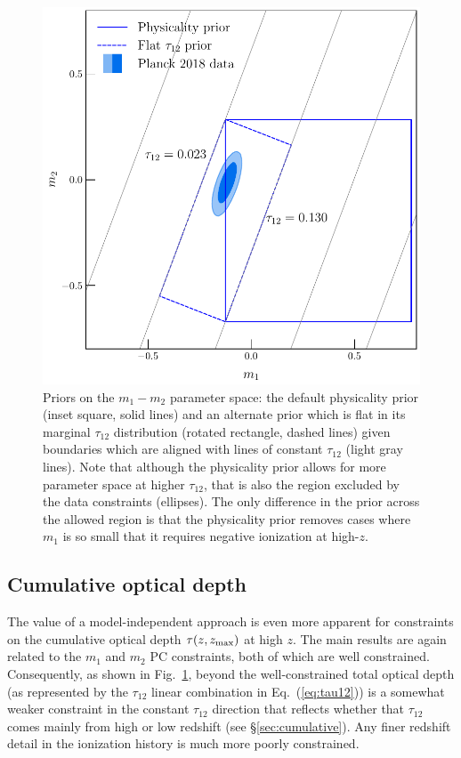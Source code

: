 \documentclass[aps,prd,twocolumn,amsmath,amssymb,showpacs,floatfix,superscriptaddress,nofootinbib]{revtex4-1}
\newcommand{\zmax}{z_{\rm max}}
\begin{document}
{ \begin{figure}
          \includegraphics[width=0.9\columnwidth]{pl18_pc_zmax30_pliklite_srollv2_1015_plot_rotated_box_flat_tau12.pdf}
          \caption {Priors on the $m_1-m_2$ parameter space: the default physicality prior (inset square, solid lines) and an alternate prior which is  flat in its marginal
           $\tau_{12}$ distribution (rotated rectangle, dashed lines) given boundaries
           which are aligned with lines of constant $\tau_{12}$ (light gray lines). Note that although the physicality prior allows for more parameter space at higher $\tau_{12}$, that is also the region excluded by the data constraints (ellipses). The only difference in the prior across the allowed region is that the physicality prior removes cases where $m_1$ is so small that it requires negative ionization at high-$z$.} 
          \label{fig:prior_box}
\end{figure}


%
%
%
\subsection{Cumulative optical depth}

The value of a model-independent approach is even more apparent for constraints on the
cumulative optical depth $\tau(z, \zmax)$ at high $z$.
The main results are again related to the $m_1$ and $m_2$ PC constraints, both of which are well constrained.  
Consequently, as shown in Fig.~\ref{fig:prior_box}, beyond the well-constrained total optical depth (as represented by the $\tau_{12}$ linear combination in Eq.~(\ref{eq:tau12})) 
is a somewhat weaker constraint in the constant $\tau_{12}$ direction that reflects whether that $\tau_{12}$ comes mainly from high or low redshift (see \S \ref{sec:cumulative}).
Any finer redshift detail in the ionization history is much more poorly constrained.

}
\end{document}
